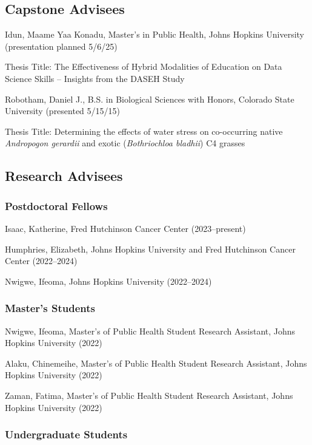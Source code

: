 \documentclass{cv}
\begin{document}
\subsection*{Capstone Advisees}

Idun, Maame Yaa Konadu, Master's in Public Health, Johns Hopkins University (presentation planned 5/6/25)

Thesis Title: The Effectiveness of Hybrid Modalities of Education on Data Science Skills – Insights from the DASEH Study

Robotham, Daniel J., B.S. in Biological Sciences with Honors, Colorado State University (presented 5/15/15)

Thesis Title: Determining the effects of water stress on co-occurring native \textit{Andropogon gerardii} and exotic (\textit{Bothriochloa bladhii}) C4 grasses

\subsection*{Research Advisees}

\subsubsection*{Postdoctoral Fellows}

Isaac, Katherine, Fred Hutchinson Cancer Center (2023--present)

Humphries, Elizabeth, Johns Hopkins University and Fred Hutchinson Cancer Center (2022--2024)

Nwigwe, Ifeoma, Johns Hopkins University (2022--2024)

\subsubsection*{Master's Students}

Nwigwe, Ifeoma, Master's of Public Health Student Research Assistant, Johns Hopkins University (2022)

Alaku, Chinemeihe, Master's of Public Health Student Research Assistant, Johns Hopkins University (2022)

Zaman, Fatima, Master's of Public Health Student Research Assistant, Johns Hopkins University (2022)

\subsubsection*{Undergraduate Students}
\end{document}

